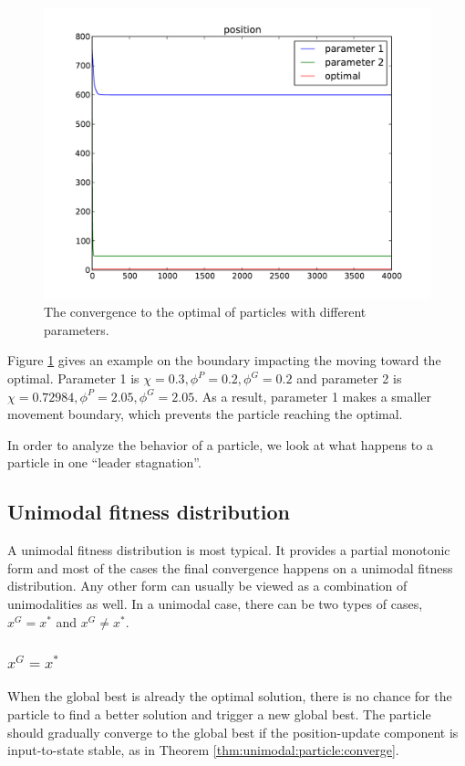 \begin{figure}[tbph]
\centering
\includegraphics[width=0.7\linewidth]{./simfig/bound/bound_position}
\caption{The convergence to the optimal of particles with different parameters.}
\label{fig:bound_position}
\end{figure}

Figure \ref{fig:bound_position} gives an example on the boundary impacting the moving toward the optimal.
Parameter 1 is $ \chi = 0.3, \phi^{P} = 0.2, \phi^{G} = 0.2 $ and parameter 2 is $ \chi = 0.72984, \phi^{P} = 2.05, \phi^{G} = 2.05 $.
As a result, parameter 1 makes a smaller movement boundary, which prevents the particle reaching the optimal.

In order to analyze the behavior of a particle, we look at what happens to a particle in one ``leader stagnation''. 

\subsection{Unimodal fitness distribution}

A unimodal fitness distribution is most typical.
It provides a partial monotonic form and most of the cases the final convergence happens on a unimodal fitness distribution.
Any other form can usually be viewed as a combination of unimodalities as well.
In a unimodal case, there can be two types of cases, $ x^{G} = x^{*} $ and $ x^{G} \not = x^{*} $.

\subsubsection{$ x^{G} = x^{*} $}

When the global best is already the optimal solution, there is no chance for the particle to find a better solution and trigger a new global best.
The particle should gradually converge to the global best if the position-update component is input-to-state stable, as in Theorem \ref{thm:unimodal:particle:converge}.

